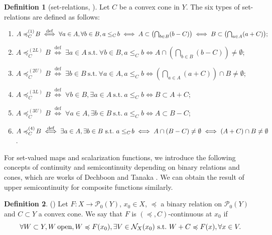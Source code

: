 \documentclass[a4paper,11pt]{jsarticle}
\theoremstyle{definition}
\newtheorem{dfn}{Definition}[section]
\newcommand{\pow}[1]{\mathcal{P}_{0}(#1)}
\newcommand{\defarrow}{\;\mathrel{\overset{\mathrm{def}}{\Longleftrightarrow}}\;}
\newcommand{\bleq}[1]{\leq_{#1}\!}
\newcommand{\setrel}[2]{\preccurlyeq^{(#1)}_{#2}\!}
\newcommand{\st}{\ \mathrm{s.t.}\ }
\begin{document}
\begin{dfn}[set-relations, \cite{KuroiwaTanakaHa1997}]\label{SetRelations}
  Let $C$ be a convex cone in $Y$.
  The six types of set-relations are defined as follows:
  \begin{enumerate}
    \item $A\setrel{1}{C}B \defarrow
            \forall{a\in{A}}, \forall{b\in{B}}, a\bleq{C}b
            \\
            \iff
            A\subset{\left(\bigcap_{b\in{B}}(b-C)\right)}
            \iff
            B\subset{\left(\bigcap_{a\in{A}}(a+C)\right)};$
    \item $A\setrel{2L}{C}B \defarrow
            \exists{a\in{A}}\st\forall{b\in{B}}, a\bleq{C}b
            \iff
            A\cap{\left(\bigcap_{b\in{B}}(b-C)\right)}\ne\emptyset$;
    \item $A\setrel{2U}{C}B \defarrow
            \exists{b\in{B}}\st\forall{a\in{A}}, a\bleq{C}b
            \iff
            \left(\bigcap_{a\in{A}}(a+C)\right)\cap{B}\ne\emptyset$;
    \item $A\setrel{3L}{C}B \defarrow
            \forall{b\in{B}}, \exists{a\in{A}}\st a\bleq{C}b
            \iff B\subset{A+C}$;
    \item $A\setrel{3U}{C} B \defarrow
            \forall{a\in{A}}, \exists{b\in{B}}\st a\bleq{C}b
            \iff A\subset{B-C}$;
    \item $A\setrel{4}{C}B \defarrow
            \exists{a\in{A}}, \exists{b\in{B}}\st a\bleq{C}b
            \\
            \iff A\cap{(B-C)}\ne\emptyset
            \iff (A+C)\cap{B}\ne\emptyset$.
  \end{enumerate}
\end{dfn}

For set-valued maps and scalarization functions, we introduce the following concepts of continuity and semicontinuity depending on
binary relations and cones, which are works of Dechboon and Tanaka \cite{DechboonTanaka2024}.
We can obtain the result of upper semicontinuity for composite functions similarly.

\begin{dfn}{(\cite{DechboonTanaka2024})}
  Let $F \colon X \to \pow{Y}$, $x_0 \in X$, $\preccurlyeq$ a binary relation on $\pow{Y}$
  and $C \subset Y$ a convex cone. We say that $F$ is $(\preccurlyeq, C)$-continuous at $x_0$ if
  \begin{equation}
    \forall W \subset Y, W\:\text{open},W \preccurlyeq F(x_0), \exists V \in \mathcal{N}_{X}(x_0) \st W + C \preccurlyeq F(x), \forall x \in V. \notag
  \end{equation}
\end{dfn}
\end{document}
